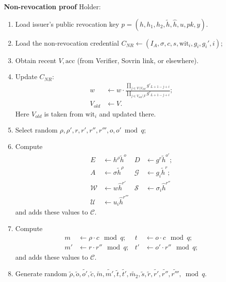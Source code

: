 \documentclass[a4paper]{article}
\begin{document}
\label{sec:prepare}

\textbf{Non-revocation proof}
Holder:
\begin{enumerate}
\item Load issuer's public revocation key $p = (h,h_1,h_2,\widetilde{h},\widehat{h},u,pk,y)$.
\item Load the non-revocation credential $C_{NR}\leftarrow(I_A,\sigma,c,s,\mathrm{wit}_i,g_i,g_i',i)$;
\item Obtain recent $V,\mathrm{acc}$ (from Verifier, Sovrin link, or elsewhere).
\item Update $C_{NR}$:
\begin{align*}
w&\leftarrow w\cdot \frac{\prod_{j\in V\setminus V_{old}}g'_{L+1-j+i}}{\prod_{j\in V_{old}\setminus V}g'_{L+1-j+i}};\\
V_{old}&\leftarrow V.
\end{align*}
Here $ V_{old}$ is taken from $\mathrm{wit}_i$ and updated there.

\item Select random $\rho,\rho',r,r',r'',r''',o,o'\bmod{q}$;
\item Compute
\begin{align}
E &\leftarrow h^{\rho} \widetilde{h}^o &
D & \leftarrow g^r\widetilde{h}^{o'};\\
A &\leftarrow \sigma \widetilde{h}^{\rho}&
\mathcal{G} &\leftarrow g_i\widetilde{h}^r;\\
\mathcal{W} &\leftarrow w\widehat{h}^{r'} &
\mathcal{S}&\leftarrow \sigma_i \widehat{h}^{r''}\\
\mathcal{U}&\leftarrow u_i \widehat{h}^{r'''}
\end{align}
and adds these values to $\mathcal{C}$.
\item Compute
\begin{align}
m&\leftarrow \rho \cdot c \mod{q}; & t&\leftarrow o\cdot c \mod{q};\\
m'&\leftarrow r\cdot r''\mod{q}; & t'&\leftarrow o'\cdot r'' \mod{q};
\end{align}
and adds these values to $\mathcal{C}$.
\item Generate random $\widetilde{\rho},\widetilde{o},\widetilde{o'},\widetilde{c},
\widetilde{m},\widetilde{m'},\widetilde{t},\widetilde{t'},
\widetilde{m_2},\widetilde{s},
\widetilde{r},\widetilde{r'},\widetilde{r''},\widetilde{r'''},
\bmod{q}$.


\end{enumerate}
\end{document}
